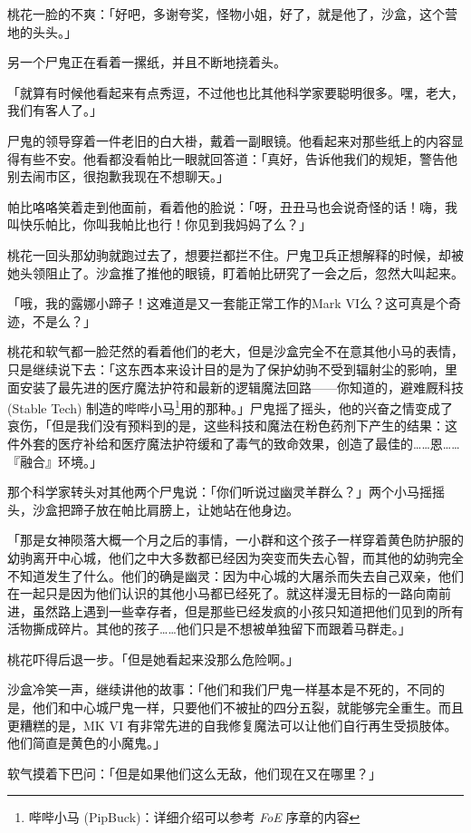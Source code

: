 桃花一脸的不爽：「好吧，多谢夸奖，怪物小姐，好了，就是他了，沙盒，这个营地的头头。」

另一个尸鬼正在看着一摞纸，并且不断地挠着头。

「就算有时候他看起来有点秀逗，不过他也比其他科学家要聪明很多。嘿，老大，我们有客人了。」

尸鬼的领导穿着一件老旧的白大褂，戴着一副眼镜。他看起来对那些纸上的内容显得有些不安。他看都没看帕比一眼就回答道：「真好，告诉他我们的规矩，警告他别去闹市区，很抱歉我现在不想聊天。」

帕比咯咯笑着走到他面前，看着他的脸说：「呀，丑丑马也会说奇怪的话！嗨，我叫快乐帕比，你叫我帕比也行！你见到我妈妈了么？」

桃花一回头那幼驹就跑过去了，想要拦都拦不住。尸鬼卫兵正想解释的时候，却被她头领阻止了。沙盒推了推他的眼镜，盯着帕比研究了一会之后，忽然大叫起来。

「哦，我的露娜小蹄子！这难道是又一套能正常工作的Mark
VI么？这可真是个奇迹，不是么？」

桃花和软气都一脸茫然的看着他们的老大，但是沙盒完全不在意其他小马的表情，只是继续说下去：「这东西本来设计目的是为了保护幼驹不受到辐射尘的影响，里面安装了最先进的医疗魔法护符和最新的逻辑魔法回路——你知道的，避难厩科技 (Stable Tech) 制造的哔哔小马\footnote{哔哔小马 (PipBuck)：详细介绍可以参考 \emph{FoE} 序章的内容}用的那种。」尸鬼摇了摇头，他的兴奋之情变成了哀伤，「但是我们没有预料到的是，这些科技和魔法在粉色药剂下产生的结果：这件外套的医疗补给和医疗魔法护符缓和了毒气的致命效果，创造了最佳的……恩……『融合』环境。」

那个科学家转头对其他两个尸鬼说：「你们听说过幽灵羊群么？」两个小马摇摇头，沙盒把蹄子放在帕比肩膀上，让她站在他身边。

「那是女神陨落大概一个月之后的事情，一小群和这个孩子一样穿着黄色防护服的幼驹离开中心城，他们之中大多数都已经因为突变而失去心智，而其他的幼驹完全不知道发生了什么。他们的确是幽灵：因为中心城的大屠杀而失去自己双亲，他们在一起只是因为他们认识的其他小马都已经死了。就这样漫无目标的一路向南前进，虽然路上遇到一些幸存者，但是那些已经发疯的小孩只知道把他们见到的所有活物撕成碎片。其他的孩子……他们只是不想被单独留下而跟着马群走。」

桃花吓得后退一步。「但是她看起来没那么危险啊。」

沙盒冷笑一声，继续讲他的故事：「他们和我们尸鬼一样基本是不死的，不同的是，他们和中心城尸鬼一样，只要他们不被扯的四分五裂，就能够完全重生。而且更糟糕的是，MK VI 有非常先进的自我修复魔法可以让他们自行再生受损肢体。他们简直是黄色的小魔鬼。」

软气摸着下巴问：「但是如果他们这么无敌，他们现在又在哪里？」

